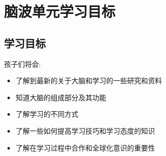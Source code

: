 \chapter{脑波单元学习目标}
\section{学习目标}
    孩子们将会:
    \begin{itemize}
       \item 了解到最新的关于大脑和学习的一些研究和资料 
        \item 知道大脑的组成部分及其功能
        \item 了解学习的不同方式  
        \item 了解一些如何提高学习技巧和学习态度的知识
        \item 了解在学习过程中合作和全球化意识的重要性
    \end{itemize}  
    
